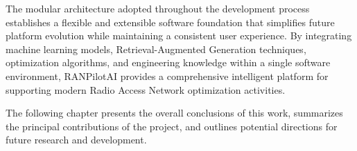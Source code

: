 The modular architecture adopted throughout the development process establishes a flexible and extensible software foundation that simplifies future platform evolution while maintaining a consistent user experience. By integrating machine learning models, Retrieval-Augmented Generation techniques, optimization algorithms, and engineering knowledge within a single software environment, RANPilotAI provides a comprehensive intelligent platform for supporting modern Radio Access Network optimization activities.

The following chapter presents the overall conclusions of this work, summarizes the principal contributions of the project, and outlines potential directions for future research and development.
